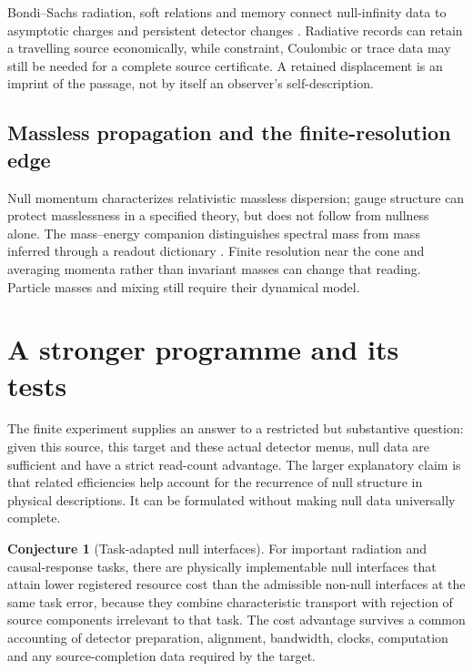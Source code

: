 \documentclass[12pt,a4paper]{article}
\theoremstyle{definition}
\newtheorem{conjecture}[theorem]{Conjecture}
\begin{document}
Bondi--Sachs radiation, soft relations and memory connect null-infinity
data to asymptotic charges and persistent detector changes
\cite{Bondi1962,Sachs1962,Weinberg1965,Strominger2018}. Radiative records
can retain a travelling source economically, while constraint, Coulombic
or trace data may still be needed for a complete source certificate.
A retained displacement is an imprint of the passage, not by itself
an observer's self-description.

\subsection{Massless propagation and the finite-resolution edge}

Null momentum characterizes relativistic massless dispersion; gauge
structure can protect masslessness in a specified theory, but does not
follow from nullness alone. The mass--energy companion distinguishes
spectral mass from mass inferred through a readout dictionary
\cite{Liu2026MassEnergy}. Finite resolution near the cone and averaging
momenta rather than invariant masses can change that reading. Particle
masses and mixing still require their dynamical model.

\section{A stronger programme and its tests}
\label{sec:programme}

The finite experiment supplies an answer to a restricted but substantive
question: given this source, this target and these actual detector menus,
null data are sufficient and have a strict read-count advantage. The
larger explanatory claim is that related efficiencies help account for
the recurrence of null structure in physical descriptions. It can be
formulated without making null data universally complete.

\begin{conjecture}[Task-adapted null interfaces]
For important radiation and causal-response tasks, there are physically
implementable null interfaces that attain lower registered resource cost
than the admissible non-null interfaces at the same task error, because
they combine characteristic transport with rejection of source components
irrelevant to that task. The cost advantage survives a common accounting
of detector preparation, alignment, bandwidth, clocks, computation and
any source-completion data required by the target.
\end{conjecture}
\end{document}
